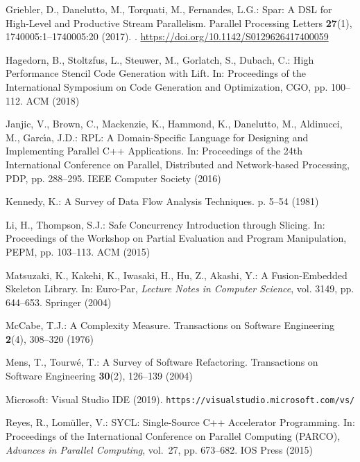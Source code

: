 \documentclass[smallextended]{svjour3}
\begin{document}
\begin{thebibliography}{10}
Griebler, D., Danelutto, M., Torquati, M., Fernandes, L.G.: Spar: {A} {DSL} for
  High-Level and Productive Stream Parallelism.
\newblock Parallel Processing Letters \textbf{27}(1), 1740005:1--1740005:20 (2017).
\newblock {}.
\newblock \urlprefix\url{https://doi.org/10.1142/S0129626417400059}

Hagedorn, B., Stoltzfus, L., Steuwer, M., Gorlatch, S., Dubach, C.: High
  Performance Stencil Code Generation with Lift.
\newblock In: {Proceedings of the International Symposium on Code Generation and Optimization, CGO}, pp. 100--112. {ACM} (2018)

Janjic, V., Brown, C., Mackenzie, K., Hammond, K., Danelutto, M., Aldinucci,
  M., Garc{\'{\i}}a, J.D.: {RPL:} {A} Domain-Specific Language for Designing
  and Implementing Parallel {C++} Applications.
\newblock In: {Proceedings of the 24th International Conference on Parallel, Distributed and Network-based Processing, PDP}, pp. 288--295. {IEEE} Computer Society (2016)

Kennedy, K.: A Survey of Data Flow Analysis Techniques.
 p. 5–54 (1981)

Li, H., Thompson, S.J.: Safe Concurrency Introduction through Slicing.
\newblock In: {Proceedings of the Workshop on Partial Evaluation and Program Manipulation, PEPM}, pp. 103--113. {ACM} (2015)

Matsuzaki, K., Kakehi, K., Iwasaki, H., Hu, Z., Akashi, Y.: A Fusion-Embedded
  Skeleton Library.
\newblock In: Euro-Par, \emph{Lecture Notes in Computer Science}, vol. 3149,
  pp. 644--653. Springer (2004)

McCabe, T.J.: A Complexity Measure.
 Transactions on Software Engineering \textbf{2}(4), 308--320 (1976)

Mens, T., Tourw{\'{e}}, T.: A Survey of Software Refactoring.
 Transactions on Software Engineering \textbf{30}(2), 126--139 (2004)

Microsoft: {Visual Studio IDE} (2019).
\newblock \texttt{https://visualstudio.microsoft.com/vs/}

Reyes, R., Lom{\"{u}}ller, V.: {SYCL:} Single-Source {C++} Accelerator
  Programming.
\newblock In: {Proceedings of the International Conference on Parallel Computing (PARCO)}, \emph{Advances in Parallel Computing}, vol.~27, pp.
  673--682. {IOS} Press (2015)


\end{thebibliography}
\end{document}

